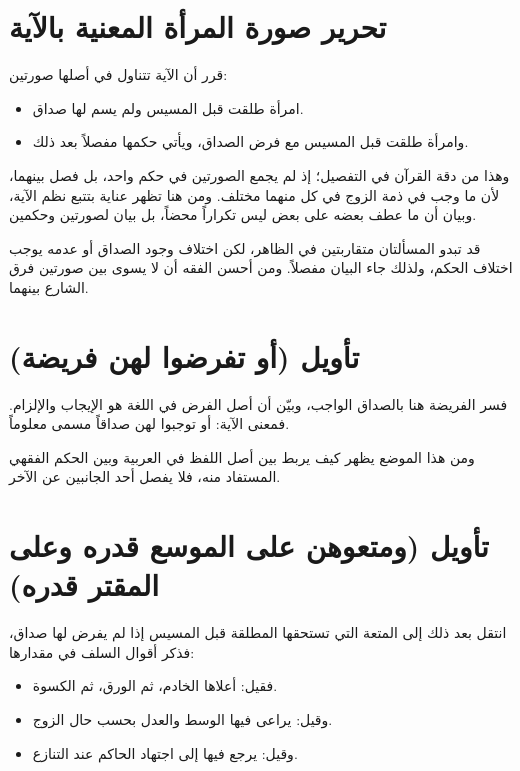 \section{تحرير صورة المرأة المعنية بالآية}
قرر  أن الآية تتناول في أصلها صورتين:
\begin{itemize}
    \item امرأة طلقت قبل المسيس ولم يسم لها صداق.
    \item وامرأة طلقت قبل المسيس مع فرض الصداق، ويأتي حكمها مفصلاً بعد ذلك.
\end{itemize}

وهذا من دقة القرآن في التفصيل؛ إذ لم يجمع الصورتين في حكم واحد، بل فصل بينهما، لأن ما وجب في ذمة الزوج في كل منهما مختلف. ومن هنا تظهر عناية  بتتبع نظم الآية، وبيان أن ما عطف بعضه على بعض ليس تكراراً محضاً، بل بيان لصورتين وحكمين.

\begin{fawaid}
قد تبدو المسألتان متقاربتين في الظاهر، لكن اختلاف وجود الصداق أو عدمه يوجب اختلاف الحكم، ولذلك جاء البيان مفصلاً. ومن أحسن الفقه أن لا يسوى بين صورتين فرق الشارع بينهما.
\end{fawaid}

\section{تأويل (أو تفرضوا لهن فريضة)}
فسر  الفريضة هنا بالصداق الواجب، وبيّن أن أصل الفرض في اللغة هو الإيجاب والإلزام. فمعنى الآية: أو توجبوا لهن صداقاً مسمى معلوماً.

ومن هذا الموضع يظهر كيف يربط  بين أصل اللفظ في العربية وبين الحكم الفقهي المستفاد منه، فلا يفصل أحد الجانبين عن الآخر.

\separator

\section{تأويل (ومتعوهن على الموسع قدره وعلى المقتر قدره)}
انتقل  بعد ذلك إلى المتعة التي تستحقها المطلقة قبل المسيس إذا لم يفرض لها صداق، فذكر أقوال السلف في مقدارها:
\begin{itemize}
    \item فقيل: أعلاها الخادم، ثم الورق، ثم الكسوة.
    \item وقيل: يراعى فيها الوسط والعدل بحسب حال الزوج.
    \item وقيل: يرجع فيها إلى اجتهاد الحاكم عند التنازع.
\end{itemize}

